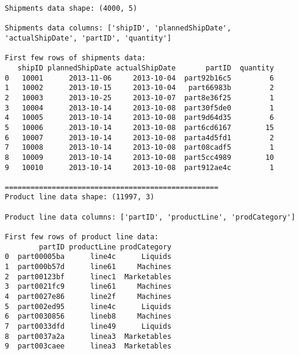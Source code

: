 \documentclass[
  letterpaper,
  DIV=11,
  numbers=noendperiod]{scrartcl}
\begin{document}
\begin{verbatim}
Shipments data shape: (4000, 5)

Shipments data columns: ['shipID', 'plannedShipDate', 'actualShipDate', 'partID', 'quantity']

First few rows of shipments data:
   shipID plannedShipDate actualShipDate       partID  quantity
0   10001      2013-11-06     2013-10-04  part92b16c5         6
1   10002      2013-10-15     2013-10-04   part66983b         2
2   10003      2013-10-25     2013-10-07  part8e36f25         1
3   10004      2013-10-14     2013-10-08  part30f5de0         1
4   10005      2013-10-14     2013-10-08  part9d64d35         6
5   10006      2013-10-14     2013-10-08  part6cd6167        15
6   10007      2013-10-14     2013-10-08  parta4d5fd1         2
7   10008      2013-10-14     2013-10-08  part08cadf5         1
8   10009      2013-10-14     2013-10-08  part5cc4989        10
9   10010      2013-10-14     2013-10-08  part912ae4c         1

==================================================
Product line data shape: (11997, 3)

Product line data columns: ['partID', 'productLine', 'prodCategory']

First few rows of product line data:
        partID productLine prodCategory
0  part00005ba      line4c      Liquids
1  part000b57d      line61     Machines
2  part00123bf      linec1  Marketables
3  part0021fc9      line61     Machines
4  part0027e86      line2f     Machines
5  part002ed95      line4c      Liquids
6  part0030856      lineb8     Machines
7  part0033dfd      line49      Liquids
8  part0037a2a      linea3  Marketables
9  part003caee      linea3  Marketables
\end{verbatim}
\end{document}

